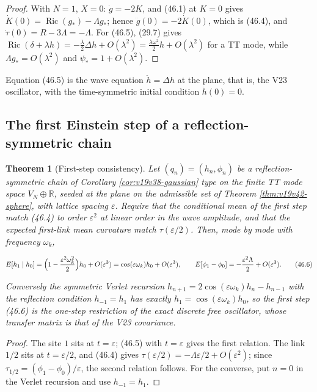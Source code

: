\documentclass[11pt]{article}
\newtheorem{theorem}{Theorem}[section]
\theoremstyle{remark}
\begin{document}
\begin{proof}
With \(N=1\), \(X=0\): \(\dot g=-2K\), and (46.1) at \(K=0\) gives
\(\dot K(0)=\operatorname{Ric}(g_*)-\Lambda g_*\); hence
\(\ddot g(0)=-2\dot K(0)\), which is (46.4), and
\(\dot\tau(0)=R-3\Lambda=-\Lambda\).  For (46.5), (29.7) gives
\(\operatorname{Ric}(\delta+\lambda h)=-\tfrac\lambda2\Delta h+O(\lambda^2)
=\tfrac{\lambda\omega^2}2h+O(\lambda^2)\) for a TT mode, while
\(\Lambda g_*=O(\lambda^2)\) and \(\psi_*=1+O(\lambda^2)\).
\end{proof}

Equation (46.5) is the wave equation \(\ddot h=\Delta h\) at the plane,
that is, the V23 oscillator, with the time-symmetric initial condition
\(\dot h(0)=0\).

\subsection{The first Einstein step of a reflection-symmetric chain}

\begin{theorem}[First-step consistency]
\label{thm:v19v43-step}
Let \((q_n)=(h_n,\phi_n)\) be a reflection-symmetric chain of
Corollary \ref{cor:v19v38-gaussian} type on the finite TT mode space
\(V_N\oplus\mathbb R\), seeded at the plane on the admissible set of
Theorem \ref{thm:v19v42-sphere}, with lattice spacing \(\varepsilon\).
Require that the conditional mean of the first step match (46.4) to
order \(\varepsilon^2\) at linear order in the wave amplitude, and that
the expected first-link mean curvature match \(\tau(\varepsilon/2)\).
Then, mode by mode with frequency \(\omega_k\),

\[
 E[h_1\mid h_0]=\Bigl(1-\frac{\varepsilon^2\omega_k^2}2\Bigr)h_0+O(\varepsilon^3)
 =\cos(\varepsilon\omega_k)h_0+O(\varepsilon^3),
 \qquad
 E[\phi_1-\phi_0]=-\frac{\varepsilon^2\Lambda}{2}+O(\varepsilon^3).     \tag{46.6}
\]

Conversely the symmetric Verlet recursion
\(h_{n+1}=2\cos(\varepsilon\omega_k)h_n-h_{n-1}\) with the reflection
condition \(h_{-1}=h_1\) has exactly \(h_1=\cos(\varepsilon\omega_k)h_0\),
so the first step (46.6) is the one-step restriction of the exact
discrete free oscillator, whose transfer matrix is that of the V23
covariance.
\end{theorem}

\begin{proof}
The site \(1\) sits at \(t=\varepsilon\); (46.5) with
\(t=\varepsilon\) gives the first relation.  The link \(1/2\) sits at
\(t=\varepsilon/2\), and (46.4) gives
\(\tau(\varepsilon/2)=-\Lambda\varepsilon/2+O(\varepsilon^2)\); since
\(\tau_{1/2}=(\phi_1-\phi_0)/\varepsilon\), the second relation follows.
For the converse, put \(n=0\) in the Verlet recursion and use
\(h_{-1}=h_1\).
\end{proof}
\end{document}
